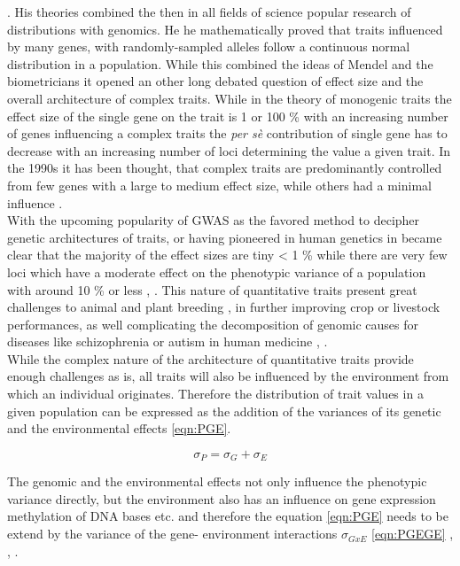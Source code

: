 \cite{fisher1919xv}.  His theories combined the then in all fields of science popular research of
distributions with genomics. He he mathematically proved that traits influenced by many genes, with
randomly-sampled alleles follow a continuous normal distribution in a population. While this combined the
ideas of Mendel and the biometricians it opened an other long debated question of effect size and the overall
architecture of complex traits. While in the theory of monogenic traits the effect size of the single gene on
the trait is 1 or 100 \% with an increasing number of genes influencing a complex traits the \textit{per sè}
contribution of single gene has to decrease with an increasing number of loci determining the value a given
trait. In the 1990s it has been thought, that complex traits are predominantly controlled from few genes with
a large to medium effect size, while others had a minimal influence
\cite{zhang2018esti}. \\
With the upcoming popularity of GWAS as the favored method to decipher genetic architectures of traits, or
having pioneered in human genetics in became clear that the majority of the effect sizes are tiny < 1 \% while
there are very few loci which have a moderate effect on the phenotypic variance of a population with around 10
\% or less \cite{korte2013advantages}, \cite{stringer2011}.  This nature of quantitative traits present great
challenges to animal \cite{goddard2009} and plant breeding \cite{wurschum2012}, in further improving crop or
livestock performances, as well complicating the decomposition of genomic causes for diseases like
schizophrenia or autism in human medicine \cite{de2014}, \cite{purcell2014}. \\
While the complex nature of the architecture of quantitative traits provide enough challenges as is, all
traits will also be influenced by the environment from which an individual originates.  Therefore the
distribution of trait values in a given population can be expressed as the addition of the variances of its
genetic and the environmental effects \ref{eqn:PGE}.

\begin{equation}
 \sigma_{P} = \sigma_{G} + \sigma_{E}
 \label{eqn:PGE}
\end{equation}

The genomic and the environmental effects not only influence the phenotypic variance directly, but the
environment also has an influence on gene expression methylation of DNA bases etc. and therefore the equation
\ref{eqn:PGE} needs to be extend by the variance of the gene- environment interactions $\sigma_{GxE}$
\ref{eqn:PGEGE} , \cite{lynch1998}, \cite{walsh2018}.
                
